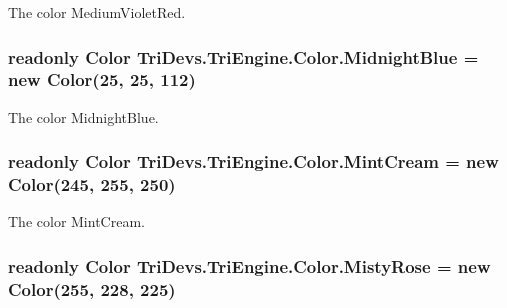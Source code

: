 The color Medium\-Violet\-Red. 

\hypertarget{struct_tri_devs_1_1_tri_engine_1_1_color_a03cb8fe929a53654129efd88e2d27c4e}{
\subsubsection[{Midnight\-Blue}]{\setlength{\rightskip}{0pt plus 5cm}readonly {\bf Color} Tri\-Devs.\-Tri\-Engine.\-Color.\-Midnight\-Blue = new {\bf Color}(25, 25, 112)\hspace{0.3cm}{\ttfamily [static]}}}\label{struct_tri_devs_1_1_tri_engine_1_1_color_a03cb8fe929a53654129efd88e2d27c4e}


The color Midnight\-Blue. 

\hypertarget{struct_tri_devs_1_1_tri_engine_1_1_color_a2fb96d140f0bb160ca57ae19fac60f51}{
\subsubsection[{Mint\-Cream}]{\setlength{\rightskip}{0pt plus 5cm}readonly {\bf Color} Tri\-Devs.\-Tri\-Engine.\-Color.\-Mint\-Cream = new {\bf Color}(245, 255, 250)\hspace{0.3cm}{\ttfamily [static]}}}\label{struct_tri_devs_1_1_tri_engine_1_1_color_a2fb96d140f0bb160ca57ae19fac60f51}


The color Mint\-Cream. 

\hypertarget{struct_tri_devs_1_1_tri_engine_1_1_color_a0869ccff63fc73cbf79f0453c8aae871}{
\subsubsection[{Misty\-Rose}]{\setlength{\rightskip}{0pt plus 5cm}readonly {\bf Color} Tri\-Devs.\-Tri\-Engine.\-Color.\-Misty\-Rose = new {\bf Color}(255, 228, 225)\hspace{0.3cm}{\ttfamily [static]}}}\label{struct_tri_devs_1_1_tri_engine_1_1_color_a0869ccff63fc73cbf79f0453c8aae871}



